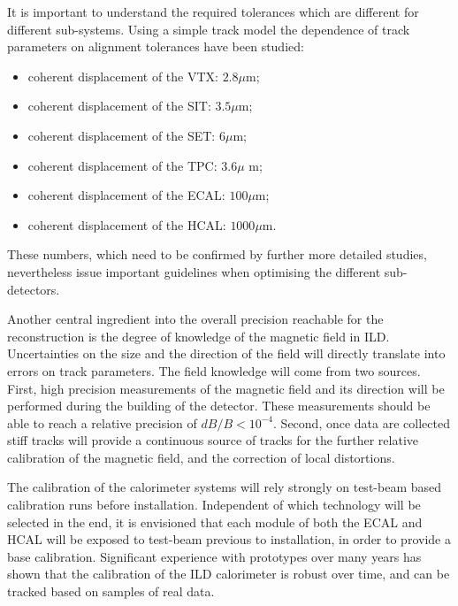 It is important to understand the required tolerances which are different for different sub-systems. Using a simple track model the dependence of track parameters on alignment tolerances have been studied: 
\begin{itemize}
    \item coherent displacement of the VTX: $2.8 \mu$m;
    \item coherent displacement of the SIT: $3.5 \mu$m;
    \item coherent displacement of the SET: $6 \mu$m;
    \item coherent displacement of the TPC: $3.6 \mu$ m;
    \item coherent displacement of the ECAL: $100 \mu$m;
    \item coherent displacement of the HCAL: $1000 \mu$m.
\end{itemize}
These numbers, which need to be confirmed by further more detailed studies, nevertheless issue important guidelines when optimising the different sub-detectors. 

Another central ingredient into the overall precision reachable for the reconstruction is the degree of knowledge of the magnetic field in ILD. Uncertainties on the size and the direction of the field will directly translate into errors on track parameters. The field knowledge will come from two sources. First, high precision measurements of the magnetic field and its direction will be performed during the building of the detector. These measurements should be able to reach a relative precision of $dB/B < 10^{-4}$.
Second, once data are collected stiff tracks will provide a continuous source of tracks for the further relative calibration of the magnetic field, and the correction of local distortions. 

The calibration of the calorimeter systems will rely strongly on test-beam based calibration runs before installation. Independent of which technology will be selected in the end, it is envisioned that each module of both the ECAL and HCAL will be exposed to test-beam previous to installation, in order to provide a base calibration. Significant experience with prototypes over many years has shown that the calibration of the ILD calorimeter is robust over time, and can be tracked based on samples of real data. 

